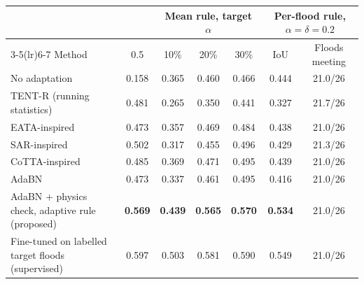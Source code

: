 \begin{tabular}{lcccccc}
\toprule
 & & \multicolumn{3}{c}{Mean rule, target $\alpha$} & \multicolumn{2}{c}{Per-flood rule, $\alpha=\delta=0.2$} \\
\cmidrule(lr){3-5}\cmidrule(lr){6-7}
Method & 0.5 & 10\% & 20\% & 30\% & IoU & Floods meeting \\
\midrule
No adaptation & 0.158 & 0.365 & 0.460 & 0.466 & 0.444 & 21.0/26 \\
TENT-R (running statistics) & 0.481 & 0.265 & 0.350 & 0.441 & 0.327 & 21.7/26 \\
EATA-inspired & 0.473 & 0.357 & 0.469 & 0.484 & 0.438 & 21.0/26 \\
SAR-inspired & 0.502 & 0.317 & 0.455 & 0.496 & 0.429 & 21.3/26 \\
CoTTA-inspired & 0.485 & 0.369 & 0.471 & 0.495 & 0.439 & 21.0/26 \\
AdaBN & 0.473 & 0.337 & 0.461 & 0.495 & 0.416 & 21.0/26 \\
AdaBN + physics check, adaptive rule (proposed) & \textbf{0.569} & \textbf{0.439} & \textbf{0.565} & \textbf{0.570} & \textbf{0.534} & 21.0/26 \\
\midrule
Fine-tuned on labelled target floods (supervised) & 0.597 & 0.503 & 0.581 & 0.590 & 0.549 & 21.0/26 \\
\bottomrule
\end{tabular}
